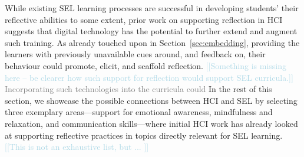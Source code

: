 \documentclass[prodmode,acmtochi]{acmsmall}
\newcommand{\todo}[1]{\textrm{\textrm{\textcolor{LightBlue}{[[#1]]}}}}
\newcommand{\rephrase}[1]{\textrm{\textrm{\textcolor{gray}{#1}}}}
\begin{document}
While existing SEL learning processes are successful in developing students' their reflective abilities to some extent, prior work on supporting reflection in HCI suggests that digital technology has the potential to further extend and augment such training. As already touched upon in Section~\ref{sec:embedding}, providing the learners with previously unavailable cues around, and feedback on, their behaviour could promote, elicit, and scaffold reflection. \todo{Something is missing here -- be clearer how such support for reflection would support SEL curricula.} \rephrase{Incorporating such technologies into the curricula could } In the rest of this section, we showcase the possible connections between HCI and SEL by selecting three exemplary areas---support for emotional awareness, mindfulness and relaxation, and communication skills---where initial HCI work has already looked at supporting reflective practices in topics directly relevant for SEL learning. \todo{This is not an exhaustive list, but ... }


\end{document}
